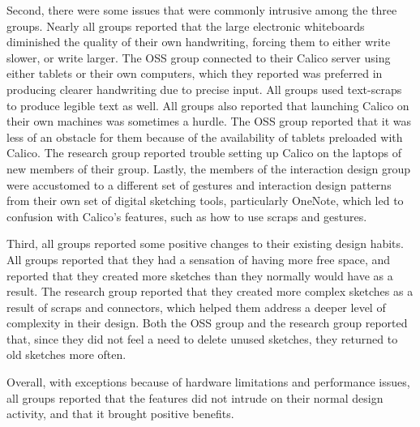 Second, there were some issues that were commonly intrusive among the three groups. Nearly all groups reported that the large electronic whiteboards diminished the quality of their own handwriting, forcing them to either write slower, or write larger. The OSS group connected to their Calico server using either tablets or their own computers, which they reported was preferred in producing clearer handwriting due to precise input. All groups used text-scraps to produce legible text as well. All groups also reported that launching Calico on their own machines was sometimes a hurdle. The OSS group reported that it was less of an obstacle for them because of the availability of tablets preloaded with Calico. The research group reported trouble setting up Calico on the laptops of new members of their group. Lastly, the members of the interaction design group were accustomed to a different set of gestures and interaction design patterns from their own set of digital sketching tools, particularly OneNote, which led to confusion with Calico's features, such as how to use scraps and gestures.


Third, all groups reported some positive changes to their existing design habits. All groups reported that they had a sensation of having more free space, and reported that they created more sketches than they normally would have as a result. The research group reported that they created more complex sketches as a result of scraps and connectors, which helped them address a deeper level of complexity in their design. Both the OSS group and the research group reported that, since they did not feel a need to delete unused sketches, they returned to old sketches more often.



Overall, with exceptions because of hardware limitations and performance issues, all groups reported that the features did not intrude on their normal design activity, and that it brought positive benefits. 



